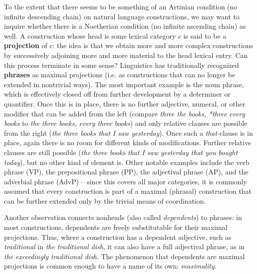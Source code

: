 To the extent that there seems to be something of an Artinian condition (no
infinite descending chain) on natural language constructions, we may want to
inquire whether there is a Noetherian condition (no infinite ascending chain)
as well. A construction whose head is some lexical category $c$ is said to be
a {\bf projection} of $c$: the idea is that we obtain more and more complex
constructions by successively adjoining more and more material to the head
lexical entry. Can this process terminate in some sense? Linguistics has
traditionally recognized {\bf phrases} as maximal projections (i.e. as
constructions that can no longer be extended in nontrivial ways). The most
important example is the noun phrase, which is effectively closed off from
further development by a determiner or quantifier. Once this is in place,
there is no further adjective, numeral, or other modifier that can be added
from the left (compare {\it *three the books, *three every books} to {\it the
  three books, every three books}) and only relative clauses are possible from
the right ({\it the three books that I saw yesterday}). Once such a {\it
  that-}clause is in place, again there is no room for different kinds of
modifications. Further relative clauses are still possible ({\it the three
  books that I saw yesterday that you bought today}), but no other kind of
element is. Other notable examples include the verb phrase (VP), the
prepositional phrase (PP), the adjectival phrase (AP), and the adverbial
phrase (AdvP) -- since this covers all major categories, it is commonly
assumed that every construction is part of a maximal (phrasal) construction
that can be further extended only by the trivial means of coordination.
  
 
 

Another observation connects nonheads (also called {\it dependents}) to
phrases: in most constructions, dependents are freely substitutable for their
maximal projections. Thus, where a construction has a dependent adjective,
such as {\it traditional} in {\it the traditional dish}, it can also have a
full adjectival phrase, as in {\it the exceedingly traditional dish}. The
phenomenon that dependents are maximal projections is common enough to have a
name of its own: {\it maximality}.

